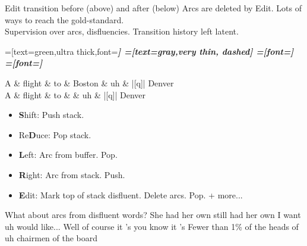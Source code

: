 \documentclass[color=usenames,dvipsnames]{lecture}
\begin{document}
\begin{plain}{Edit transition before (above) and after (below)}
Arcs are deleted by Edit. Lots of ways to reach the gold-standard.\\
Supervision over arcs, disfluencies. Transition history left latent.\\
    \centering
    \begin{dependency}[theme=simple]
    =[text=green,ultra thick,font=\bfseries\itshape]
    =[text=gray,very thin, dashed]
    =[font=\bfseries\itshape]
    =[font=\itshape]
    \begin{deptext}[column sep=.075cm, row sep=.1ex]
        A \& flight \& to \&  Boston \&  uh \& |[q]| Denver \\
        A \& flight \& to \&   \&  uh \& |[q]| Denver \\
    \end{deptext}

\end{dependency}
\begin{itemize}
  \item \textbf{S}hift: Push stack.
  \item Re\textbf{D}uce: Pop stack.
  \item \textbf{L}eft: Arc from buffer. Pop.
  \item \textbf{R}ight: Arc from stack. Push.
  \item \textbf{E}dit: Mark top of stack disfluent. Delete arcs. Pop. \textcolor{faint}{+ more...}
\end{itemize}
\end{plain}


\begin{points}{What about arcs from disfluent words?}
\p She \textcolor{faint}{had her own} still had her own
\p I \textcolor{faint}{want} uh would like...
\p Well of course \textcolor{faint}{it 's} you know it 's
\p Fewer than 1\% of the \textcolor{faint}{heads of} uh chairmen of the board
\end{points}
\end{document}
